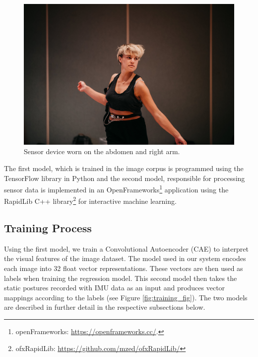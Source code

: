 \begin{figure}[ht]
    \centering
    \includegraphics[width=\textwidth]{Chapters/Figures/modi_dis/deva_imu_abdomen.jpg}
    \caption{Sensor device worn on the abdomen and right arm.}
    \label{fig:placement}
\end{figure}


The first model, which is trained in the image corpus is programmed using the TensorFlow library \cite{abadi_tensorflow_2016} in Python and the second model, responsible for processing sensor data is implemented in an OpenFrameworks\footnote{openFrameworks: \url{https://openframeworks.cc/}.} application using the RapidLib C++ library\footnote{ofxRapidLib: \url{https://github.com/mzed/ofxRapidLib/}} for interactive machine learning.

\subsection*{Training Process}
\label{training_process}

Using the first model, we train a Convolutional Autoencoder (CAE) to interpret the visual features of the image dataset. The model used in our system encodes each image into 32 float vector representations. These vectors are then used as labels when training the regression model. This second model then takes the static postures recorded with IMU data as an input and produces vector mappings according to the labels (see Figure \ref{fig:training_fig}). The two models are described in further detail in the respective subsections below.

